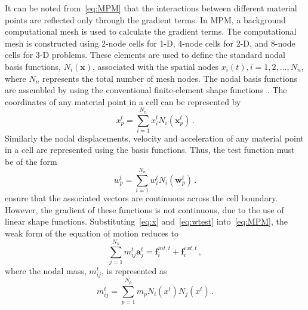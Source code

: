 It can be noted from~\cref{eq:MPM} that the interactions between different 
material points are reflected only through the gradient terms. In MPM, a 
background computational mesh is used to calculate the gradient terms. The 
computational mesh is constructed using 2-node cells for 1-D, 4-node cells for 
2-D, and 8-node cells for 3-D problems. These elements are used to define the 
standard nodal basis functions, $\mathit{N}_{i}(\mathbf{x})$, associated with 
the spatial nodes $\mathbf{\mathit{x}}_{i}(t), 
\mathit{i}=1,2,\dots,\mathit{N}_{n}$, where $\mathit{N}_{n}$ represents the 
total number of mesh nodes. The nodal basis functions are assembled by using 
the conventional finite-element shape functions~\citep{Chen2002}. The 
coordinates of any material point in a cell can be represented by
%
\begin{equation}
\mathbf{\mathit{x}}_{p}^{t} = \sum\limits_{\mathit{i}=1}^{\mathit{N}_{n}} 
\mathbf{\mathit{x}}_{\mathit{i}}^{t}\mathit{N}_{\mathit{i}}(\mathbf{x}_{p}^{t}) 
\,.
\label{eq:x}
\end{equation}
%
Similarly the nodal displacements, velocity and acceleration of any material 
point in a cell are represented using the basis functions. Thus, the test 
function must be of the form
%
\begin{equation}
\mathbf{\mathit{w}}_{p}^{t} = \sum\limits_{\mathit{i}=1}^{\mathit{N}_{n}} 
\mathbf{\mathit{w}}_{\mathit{i}}^{t}\mathit{N}_{\mathit{i}}(\mathbf{w}_{p}^{t}) 
\,.
\label{eq:wtest}
\end{equation}
%
 ensure that the associated vectors are 
continuous across the cell boundary. However, the gradient of these functions 
is not continuous, due to the use of linear shape functions. 
Substituting~\cref{eq:x} and~\cref{eq:wtest} into~\cref{eq:MPM}, the weak form 
of the equation of motion reduces to
%
\begin{equation}
\sum\limits_{\mathit{j}=1}^{\mathit{N}_{n}} m_{\mathit{ij}}^{\mathit{t}} 
\mathbf{a}_{\mathit{j}}^{\mathit{t}} = \mathbf{f}_{\mathit{i}}^{int,\mathit{t}} 
+ \mathbf{f}_{\mathit{i}}^{ext,\mathit{t}} \,,
\label{eq:fmaMPM}
\end{equation}
%
where the nodal mass, $m_{\mathit{ij}}^{\mathit{t}}$, is represented as
%
\begin{equation}
m_{\mathit{ij}}^{\mathit{t}} = \sum\limits_{\mathit{p=1}}^{N_{p}} 
\mathit{m}_{p} \mathit{N}_{\mathit{i}} (\mathbf{\mathit{x}}^{\mathit{t}}) 
\mathit{N}_{\mathit{j}} (\mathbf{\mathit{x}}^{\mathit{t}}) \,.
\end{equation}
